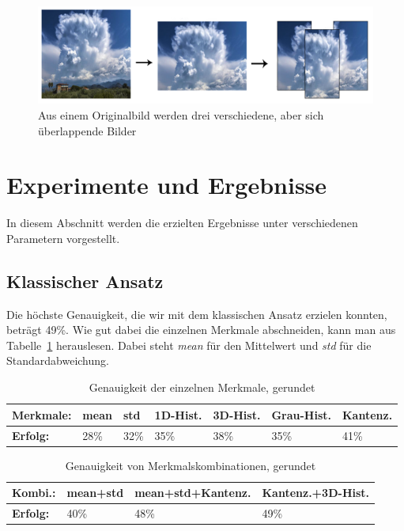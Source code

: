 \documentclass[a4,german]{article}
\begin{document}
\begin{figure}[h!]
\centering
\includegraphics[width=\textwidth]{Augmentation}
\caption{Aus einem Originalbild werden drei verschiedene, aber sich überlappende Bilder}
    \label{fig:augmentation}
\end{figure}


\section{Experimente und Ergebnisse}
\label{sec:experimente}
In diesem Abschnitt werden die erzielten Ergebnisse unter verschiedenen Parametern vorgestellt.

\subsection{Klassischer Ansatz}%
Die höchste Genauigkeit, die wir mit dem klassischen Ansatz erzielen konnten, beträgt 49\%. Wie gut dabei die einzelnen Merkmale abschneiden, kann man aus Tabelle~\ref{tab:gen} herauslesen. Dabei steht \textit{mean} für den Mittelwert und \textit{std} für die Standardabweichung. 

\begin{table}[h]
\centering
\begin{tabular}{|l|l|l|l|l|l|l|}
 \hline
 \textbf{Merkmale:}&mean&std&1D-Hist.&3D-Hist.&Grau-Hist.&Kantenz.\\
 \hline
 \textbf{Erfolg:} & 28\% & 32\% & 35\% & 38\% & 35\% & 41\% \\
 \hline
\end{tabular}
\caption{Genauigkeit der einzelnen Merkmale, gerundet}
\label{tab:gen}
\end{table}

\begin{table}[h]
\centering
\begin{tabular}{|l|l|l|l|}
 \hline
 \textbf{Kombi.:}&mean+std&mean+std+Kantenz.&Kantenz.+3D-Hist.\\
 \hline
 \textbf{Erfolg:} & 40\% & 48\% & 49\% \\
 \hline
\end{tabular}
\caption{Genauigkeit von Merkmalskombinationen, gerundet}
\label{tab:gen2}
\end{table}
\end{document}
